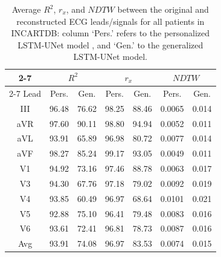 

\begin{table}
\begin{center}
\begin{small}
\renewcommand{\arraystretch}{1.1}
\renewcommand{\tabcolsep}{6pt}

\caption{Average $R^2$, $r_x$, and $NDTW$ between the original and reconstructed ECG leads/signals for all patients in INCARTDB: column `Pers.' refers to the personalized LSTM-UNet model \cite{lstm-unet}, and `Gen.' to the generalized LSTM-UNet model.}

\begin{tabular}{|c|cc|cc|cc|}
\hline
\cline{2-7}
& \multicolumn{2}{c|}{$R^2$}
& \multicolumn{2}{c|}{$r_x$} & \multicolumn{2}{c|}{$NDTW$} 
\\
\cline{2-7}
Lead & Pers. & Gen. & Pers. & Gen. & Pers. & Gen. \\
\hline
III  & 96.48 & 76.62 & 98.25  & 88.46 & 0.0065 & 0.014\\
aVR  & 97.60 & 90.11 & 98.80  & 94.94 & 0.0052 & 0.011\\
aVL & 93.91 & 65.89 & 96.98  & 80.72 & 0.0077 & 0.014 \\
aVF & 98.27 & 85.24 & 99.17  & 93.05 & 0.0049 & 0.011 \\
V1 & 94.92  & 73.16 & 97.46 & 88.78 & 0.0063 & 0.017\\
V3 &  94.30 & 67.76 & 97.18 & 79.02 & 0.0092 & 0.019 \\
V4 & 93.85  & 60.49 & 96.97 & 68.64 & 0.0101 & 0.021\\
V5 & 92.88  & 75.10 & 96.41  & 79.48 & 0.0083 & 0.016 \\
V6 & 93.61  & 72.41 & 96.81 & 78.73 & 0.0087 & 0.016 \\
\hline
Avg & 93.91 & 74.08 & 96.97 & 83.53 & 0.0074 & 0.015 \\


\hline
\end{tabular}
\label{incart_results}
\end{small}

\end{center}
\end{table}